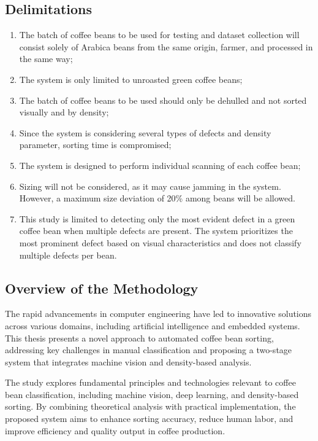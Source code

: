\subsection{Delimitations}
\begin{enumerate}
	\item The batch of coffee beans to be used for testing and dataset collection will consist solely of Arabica beans from the same origin, farmer, and processed in the same way;
	
	\item The system is only limited to unroasted green coffee beans;
	
	\item The batch of coffee beans to be used should only be dehulled and not sorted visually and by density;

	\item Since the system is considering several types of defects and density parameter, sorting time is compromised;

	\item The system is designed to perform individual scanning of each coffee bean;

	\item Sizing will not be considered, as it may cause jamming in the system. However, a maximum size deviation of 20\% among beans will be allowed.

	\item This study is limited to detecting only the most evident defect in a green coffee bean when multiple defects are present. The system prioritizes the most prominent defect based on visual characteristics and does not classify multiple defects per bean.

\end{enumerate}

\subsection{Overview of the Methodology}

The rapid advancements in computer engineering have led to innovative solutions across various domains, including artificial intelligence and embedded systems. This thesis presents a novel approach to automated coffee bean sorting, addressing key challenges in manual classification and proposing a two-stage system that integrates machine vision and density-based analysis.

The study explores fundamental principles and technologies relevant to coffee bean classification, including machine vision, deep learning, and density-based sorting. By combining theoretical analysis with practical implementation, the proposed system aims to enhance sorting accuracy, reduce human labor, and improve efficiency and quality output in coffee production. 

